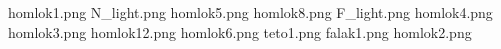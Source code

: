 homlok1.png
N_light.png
homlok5.png
homlok8.png
F_light.png
homlok4.png
homlok3.png
homlok12.png
homlok6.png
teto1.png
falak1.png
homlok2.png
